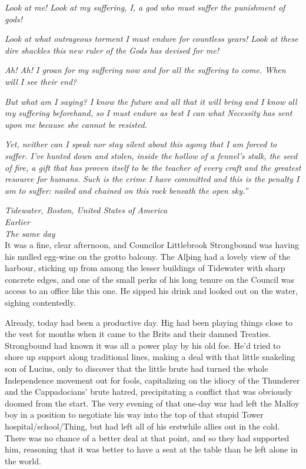 \emph{Look at me! Look at my suffering, I, a god who must suffer the
punishment of gods!}

\emph{Look at what outrageous torment I must endure for countless years!
Look at these dire shackles this new ruler of the Gods has devised for
me!}

\emph{Ah! Ah! I groan for my suffering now and for all the suffering to
come. When will I see their end?}

\emph{But what am I saying? I know the future and all that it will bring
and I know all my suffering beforehand, so I must endure as best I can
what Necessity has sent upon me because she cannot be resisted.}

\emph{Yet, neither can I speak nor stay silent about this agony that I
am forced to suffer. I've hunted down and stolen, inside the hollow of a
fennel's stalk, the seed of fire, a gift that has proven itself to be
the teacher of every craft and the greatest resource for humans. Such is
the crime I have committed and this is the penalty I am to suffer:
nailed and chained on this rock beneath the open sky.''}


\mybreak

\emph{Tidewater, Boston, United States of America}\\
\emph{Earlier}\\
\emph{The same day}\\

It was a fine, clear afternoon, and Councilor Littlebrook Strongbound
was having his mulled egg-wine on the grotto balcony. The Alþing had a
lovely view of the harbour, sticking up from among the lesser buildings
of Tidewater with sharp concrete edges, and one of the small perks of
his long tenure on the Council was access to an office like this one. He
sipped his drink and looked out on the water, sighing contentedly.

Already, today had been a productive day. Hig had been playing things
close to the vest for months when it came to the Brits and their damned
Treaties. Strongbound had known it was all a power play by his old foe.
He'd tried to shore up support along traditional lines, making a deal
with that little snakeling son of Lucius, only to discover that the
little brute had turned the whole Independence movement out for fools,
capitalizing on the idiocy of the Thunderer and the Cappadocians' brute
hatred, precipitating a conflict that was obviously doomed from the
start. The very evening of that one-day war had left the Malfoy boy in a
position to negotiate his way into the top of that stupid Tower
hospital/school/Thing, but had left all of his erstwhile allies out in
the cold. There was no chance of a better deal at that point, and so
they had supported him, reasoning that it was better to have a seat at
the table than be left alone in the world.

